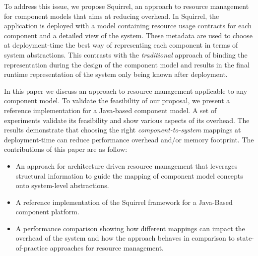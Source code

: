 
To address this issue, we propose Squirrel, an approach to resource management for component models that aims at reducing overhead.
In Squirrel, the application is deployed with a model containing resource usage contracts for each component and a detailed view of the system.
These metadata are used to choose at deployment-time the best way of representing each component in terms of system abstractions.
This contrasts with the \textit{traditional} approach of binding the representation during the design of the component model and results in the final runtime representation of the system only being known after deployment.




In this paper we discuss an approach to resource management applicable to any component model. To validate the feasibility of our proposal, we present a reference implementation for a Java-based component model.
A set of experiments validate its feasibility and show various aspects of its overhead.
The results demonstrate that choosing the right \textit{component-to-system} mappings at deployment-time can reduce performance overhead and/or memory footprint.
The contributions of this paper are as follow:
\begin{itemize}
\item An approach for architecture driven resource management that leverages structural information to guide the mapping of component model concepts onto system-level abstractions.
\item A reference implementation of the Squirrel framework for a Java-Based component platform.
\item A performance comparison showing how different mappings can impact the overhead of the system and how the approach behaves in comparison to state-of-practice approaches for resource management.
\end{itemize}

